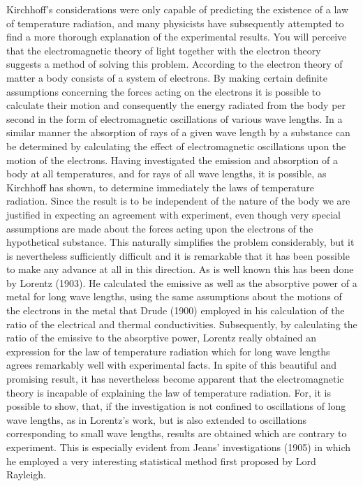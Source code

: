 Kirchhoff's considerations were only capable of predicting the
existence of a law of temperature radiation, and many physicists
have subsequently attempted to find a more thorough explanation
of the experimental results. You will perceive that the electromagnetic
theory of light together with the electron theory suggests
a method of solving this problem. According to the electron theory
of matter a body consists of a system of electrons. By making
certain definite assumptions concerning the forces acting on the
electrons it is possible to calculate their motion and consequently
the energy radiated from the body per second in the form of
electromagnetic oscillations of various wave lengths. In a similar
manner the absorption of rays of a given wave length by a substance
can be determined by calculating the effect of electromagnetic
oscillations upon the motion of the electrons. Having investigated
the emission and absorption of a body at all temperatures, and for
rays of all wave lengths, it is possible, as Kirchhoff has shown, to
determine immediately the laws of temperature radiation. Since
the result is to be independent of the nature of the body we are
justified in expecting an agreement with experiment, even though
very special assumptions are made about the forces acting upon
the electrons of the hypothetical substance. This naturally
simplifies the problem considerably, but it is nevertheless sufficiently
difficult and it is remarkable that it has been possible
to make any advance at all in this direction. As is well known
this has been done by Lorentz (1903). He calculated the
emissive as well as the absorptive power of a metal for long
wave lengths, using the same assumptions about the motions
of the electrons in the metal that Drude (1900) employed in
his calculation of the ratio of the electrical and thermal conductivities.
Subsequently, by calculating the ratio of the emissive
to the absorptive power, Lorentz really obtained an expression
for the law of temperature radiation which for long wave lengths
agrees remarkably well with experimental facts. In spite of this
beautiful and promising result, it has nevertheless become apparent
that the electromagnetic theory is incapable of explaining the law
of temperature radiation. For, it is possible to show, that, if the
investigation is not confined to oscillations of long wave lengths,
as in Lorentz's work, but is also extended to oscillations corresponding
to small wave lengths, results are obtained which are
contrary to experiment. This is especially evident from Jeans'
investigations (1905) in which he employed a very interesting
statistical method first proposed by Lord Rayleigh.

